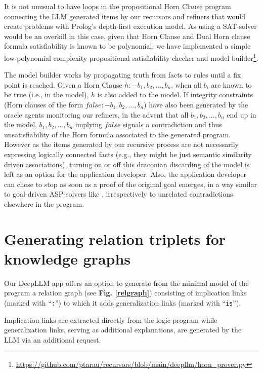 \documentclass[submission,copyright,creativecommons]{eptcs}
\begin{document}
It is not unusual to have loops in the propositional Horn Clause program connecting the LLM generated items by our recursors and refiners that would create problems with Prolog's depth-first execution model.
As using a SAT-solver would be an overkill in this case, given that Horn Clause and Dual Horn clause formula satisfiability is known to be polynomial,
we have implemented a simple low-polynomial complexity  \cite{dowling}
propositional satisfiability checker and model builder\footnote{\url{https://github.com/ptarau/recursors/blob/main/deepllm/horn_prover.py}}.

The model builder works by propagating truth from facts to rules until a fix point is reached. Given a Horn Clause $h:-b_1,b_2,...,b_n$, when all $b_i$ are known to be true (i.e., in the model), $h$ is also added to the model. If integrity constraints (Horn clauses of the form $false:-b_1,b_2,...,b_n$) have also been generated by the oracle agents monitoring our refiners, in the advent that all $b_1,b_2,...,b_n$ end up in the model,  $b_1,b_2,...,b_n$ implying $false$ signals a contradiction and thus unsatisfiability of the Horn formula associated to the  generated program.  However as the items generated by our recursive process are not necessarily expressing logically connected facts (e.g., they might be just semantic similarity driven associations), turning on or off this draconian discarding of the model is left as an option for the application developer.
Also, the application developer can chose to stop as soon as  a proof of the original goal emerges, in a way similar to goal-driven ASP-solvers like \cite{casp}, irrespectively to unrelated contradictions elsewhere in the program.

\section{Generating relation triplets for knowledge graphs}\label{rels}

Our DeepLLM app offers an option to generate from the minimal model of the program a relation graph (see {\bf Fig. \ref{relgraph}}) consisting of implication links (marked with ``{\tt :}'') to which it adds generalization links (marked with ``{\tt is}'').


Implication links are extracted directly from the logic program while generalization links, serving as additional explanations, are generated by the LLM via an additional request.
\end{document}
